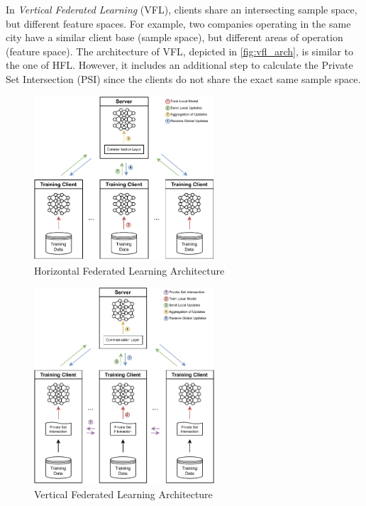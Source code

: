 In \textit{Vertical Federated Learning} (VFL), clients share an intersecting sample space, but different feature spaces. For example, two companies operating in the same city have a similar client base (sample space), but different areas of operation (feature space). The architecture of VFL, depicted in \autoref{fig:vfl_arch}, is similar to the one of HFL. However, it includes an additional step to calculate the Private Set Intersection (PSI) since the clients do not share the exact same sample space.

\begin{figure}[!htp]
    \centering
    \centering
    \includegraphics[width=0.6\textwidth]{graphics/hfl-architecture.pdf}
    \caption{Horizontal Federated Learning Architecture}
    \label{fig:hfl_arch}
\end{figure}

\begin{figure}[!hbp]
    \centering
    \centering
    \includegraphics[width=0.6\textwidth]{graphics/vfl-architecture.pdf}
    \caption{Vertical Federated Learning Architecture}
    \label{fig:vfl_arch}
\end{figure}

